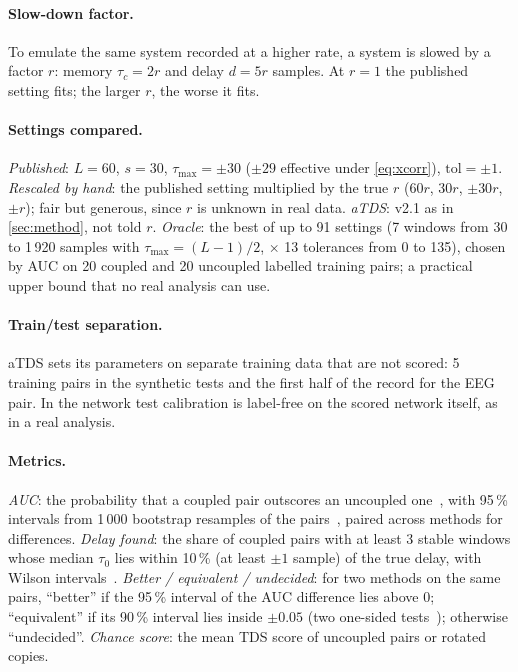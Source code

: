 \documentclass[11pt,a4paper]{article}
\begin{document}
\paragraph{Slow-down factor.} To emulate the same system recorded at a higher rate, a system is slowed by a factor $r$: memory $\tau_c = 2r$ and delay $d = 5r$ samples. At $r = 1$ the published setting fits; the larger $r$, the worse it fits.

\paragraph{Settings compared.} \emph{Published}: $L = 60$, $s = 30$, $\tau_{\max} = \pm30$ ($\pm29$ effective under \cref{eq:xcorr}), $\mathrm{tol} = \pm1$. \emph{Rescaled by hand}: the published setting multiplied by the true $r$ ($60r$, $30r$, $\pm30r$, $\pm r$); fair but generous, since $r$ is unknown in real data. \emph{aTDS}: v2.1 as in \cref{sec:method}, not told $r$. \emph{Oracle}: the best of up to 91 settings (7 windows from 30 to 1\,920 samples with $\tau_{\max} = (L-1)/2$, $\times$ 13 tolerances from 0 to 135), chosen by AUC on 20 coupled and 20 uncoupled labelled training pairs; a practical upper bound that no real analysis can use.

\paragraph{Train/test separation.} aTDS sets its parameters on separate training data that are not scored: 5 training pairs in the synthetic tests and the first half of the record for the EEG pair. In the network test calibration is label-free on the scored network itself, as in a real analysis.

\paragraph{Metrics.} \emph{AUC}: the probability that a coupled pair outscores an uncoupled one~\cite{Hanley1982MeaningUse}, with 95\,\% intervals from 1\,000 bootstrap resamples of the pairs~\cite{Efron1979BootstrapMethods}, paired across methods for differences. \emph{Delay found}: the share of coupled pairs with at least 3 stable windows whose median $\tau_0$ lies within 10\,\% (at least $\pm1$ sample) of the true delay, with Wilson intervals~\cite{Wilson1927ProbableInference}. \emph{Better / equivalent / undecided}: for two methods on the same pairs, ``better'' if the 95\,\% interval of the AUC difference lies above 0; ``equivalent'' if its 90\,\% interval lies inside $\pm0.05$ (two one-sided tests~\cite{Schuirmann1987ComparisonTwo}); otherwise ``undecided''. \emph{Chance score}: the mean TDS score of uncoupled pairs or rotated copies.
\end{document}
